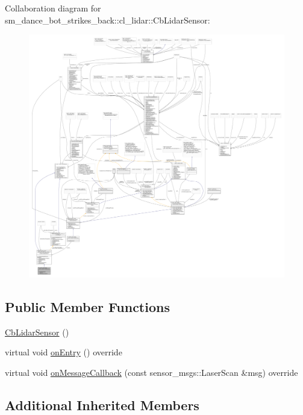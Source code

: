 Collaboration diagram for sm\+\_\+dance\+\_\+bot\+\_\+strikes\+\_\+back\+:\+:cl\+\_\+lidar\+:\+:Cb\+Lidar\+Sensor\+:
\nopagebreak
\begin{figure}[H]
\begin{center}
\leavevmode
\includegraphics[width=350pt]{structsm__dance__bot__strikes__back_1_1cl__lidar_1_1CbLidarSensor__coll__graph}
\end{center}
\end{figure}
\subsection*{Public Member Functions}
\begin{DoxyCompactItemize}
\item 
\hyperlink{structsm__dance__bot__strikes__back_1_1cl__lidar_1_1CbLidarSensor_a3d105c65e4f3b09bdbac3c5889630c16}{Cb\+Lidar\+Sensor} ()
\item 
virtual void \hyperlink{structsm__dance__bot__strikes__back_1_1cl__lidar_1_1CbLidarSensor_a82d0250dcf2d4e9b12ccd528a5d87002}{on\+Entry} () override
\item 
virtual void \hyperlink{structsm__dance__bot__strikes__back_1_1cl__lidar_1_1CbLidarSensor_ae84544368fabbe38fbf3a6bc6d2eb558}{on\+Message\+Callback} (const sensor\+\_\+msgs\+::\+Laser\+Scan \&msg) override
\end{DoxyCompactItemize}
\subsection*{Additional Inherited Members}


